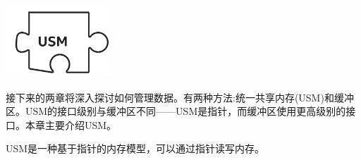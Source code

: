 \begin{center}
	\includegraphics[width=0.3\textwidth]{content/chapter-6/images/1}
\end{center}

接下来的两章将深入探讨如何管理数据。有两种方法:统一共享内存(USM)和缓冲区。USM的接口级别与缓冲区不同——USM是指针，而缓冲区使用更高级别的接口。本章主要介绍USM。\par

USM是一种基于指针的内存模型，可以通过指针读写内存。\par